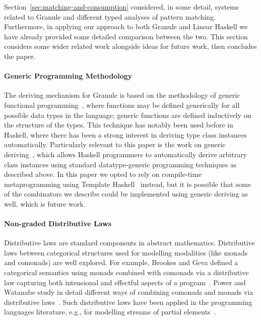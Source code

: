 Section~\ref{sec:matching-and-consumption} considered, in some detail,
systems related to Granule and different typed analyses
of pattern matching. Furthermore, in
applying our approach to both Granule and Linear Haskell
we have already provided some detailed comparison between the two. This section
considers some wider related work alongside ideas for future work,
then concludes the paper.

\paragraph{Generic Programming Methodology}
The deriving mechanism for Granule is based on the methodology of
generic functional programming~\cite{hinze2000new}, where functions
may be defined generically for all possible data types in the language;
generic functions are defined inductively on the structure of the types.
This technique has notably been used before in Haskell, where there
has been a strong interest in deriving type
class instances automatically. Particularly relevant to this paper is the work
on generic deriving~\cite{generic-deriving}, which allows Haskell programmers to
automatically derive arbitrary class instances using standard datatype-generic
programming techniques as described above. In this paper we opted to rely on
compile-time metaprogramming using Template Haskell~\cite{template-haskell}
instead, but it is possible that some of the combinators we describe could be
implemented using generic deriving as well, which is future work.

\paragraph{Non-graded Distributive Laws}
Distributive laws are standard components in abstract
mathematics. Distributive laws between categorical structures used for
modelling modalities (like monads and comonads) are well explored. For
example, Brookes and Geva defined a categorical semantics using monads
combined with comonads via a distributive law capturing both
intensional and effectful aspects of a
program~\cite{brookes1993intensional}. Power and Watanabe study in
detail different ways of combining comonads and monads via
distributive laws~\cite{power2002combining}. Such distributive laws
have been applied in the programming languages literature, e.g., for
modelling streams of partial elements~\cite{uustalu2006essence}.

